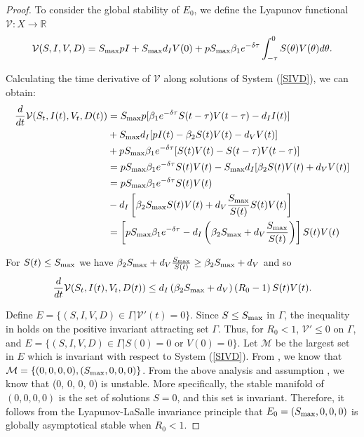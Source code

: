 \documentclass{CMHPhD-SIVD}
\begin{document}
\begin{proof} To consider the global stability of $E_0$, we define the Lyapunov functional  $\mathcal{V}: X\rightarrow\mathbb{R}$
\begin{equation}\label{34}
\mathcal{V}(S,I,V,D) = S_{\text{max}} p I+S_{\text{max}} d_I V(0)+p S_{\text{max}} \beta_1 e^{-\delta \tau}\int_{-\tau}^0S(\theta)V(\theta)d\theta.
\end{equation}

Calculating the time derivative of $\mathcal{V}$ along solutions of System (\ref{SIVD}), we can obtain:
\begin{align*}%
\frac{d}{dt}\mathcal{V}(S_t,I(t),V_t,D(t))&=\Smax p[\beta_1 e^{-\delta \tau}S(t-\tau)V(t-\tau)-d_I I(t)]\nonumber \\
&+\Smax d_I[pI(t)-\beta_2 S(t)V(t)-d_V V(t)]\nonumber \\
&+p \Smax \beta_1 e^{-\delta \tau}[S(t)V(t)-S(t-\tau)V(t-\tau)]\nonumber \\
&=p \Smax \beta_1 e^{-\delta \tau}S(t)V(t)-\Smax d_I[\beta_2 S(t)V(t)+d_V V(t)]\nonumber \\
&=p \Smax \beta_1 e^{-\delta \tau}S(t)V(t)\nonumber \\
&-d_I\left[\beta_2 \Smax S(t)V(t)+d_V \frac{\Smax}{S(t)} S(t)V(t)\right]
\nonumber \\
&= \left[p \Smax \beta_1 e^{-\delta \tau}-d_I\left(\beta_2 \Smax+d_V \frac{\Smax}{S(t)}\right)\right]S(t)V(t)\nonumber
\end{align*}

For $S(t) \le S_{\text{max}}$ we have $\beta_2 S_{\text{max}}+d_V \frac{S_{\text{max}}}{S(t)} \ge \beta_2 S_{\text{max}}+d_V $ and so
	\begin{equation}\label{35}
		\frac{d}{dt}\mathcal{V}(S_t,I(t),V_t,D(t))\le d_I\left(\beta_2 S_{\text{max}}+d_V\right)\left(R_0-1\right)S(t)V(t).
	\end{equation}

Define $E=\{(S, I, V, D)\in \Gamma |\mathcal{V}'(t)=0\}$.	Since $S\leq S_{\text{max}}$ in $\Gamma$, the inequality in  holds on the positive invariant attracting set $\Gamma$. Thus, for $R_0 < 1$, $\mathcal{V}' \le 0$ on $\Gamma$, and
	$E=\{(S, I, V, D)\in \Gamma|S(0)=0 \text{ or } V(0)=0\}$. Let $\mathcal{M}$ be the largest set in $E$ which is invariant with respect to System (\ref{SIVD}). From , we know that $\mathcal{M}=\{(0, 0, 0, 0),(S_{\text{max}}, 0, 0, 0)\}$.
	From the above analysis and assumption , we know that (0, 0, 0, 0) is unstable. More specifically,  the stable manifold of $(0,0,0,0)$ is the set of solutions $S=0$, and this set is invariant.  Therefore, it follows from the Lyapunov-LaSalle invariance principle\cite{hale1993introduction} that $E_0=(S_{\text{max}}, 0, 0, 0)$ is globally asymptotical stable when $R_0<1$.




\end{proof}
\end{document}
